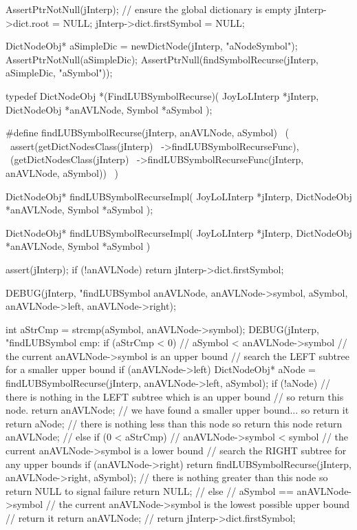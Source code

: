 \startCTest
  AssertPtrNotNull(jInterp);
  // ensure the global dictionary is empty
  jInterp->dict.root        = NULL;
  jInterp->dict.firstSymbol = NULL;

  DictNodeObj* aSimpleDic = newDictNode(jInterp, "aNodeSymbol");
  AssertPtrNotNull(aSimpleDic);
  AssertPtrNull(findSymbolRecurse(jInterp, aSimpleDic, "aSymbol"));
\stopCTest
\stopTestCase
\stopTestSuite

\startTestSuite[findLUBSymbolRecurse]

\startCHeader
typedef DictNodeObj *(FindLUBSymbolRecurse)(
  JoyLoLInterp *jInterp,
  DictNodeObj  *anAVLNode,
  Symbol       *aSymbol
);

#define findLUBSymbolRecurse(jInterp, anAVLNode, aSymbol)       \
  (                                                             \
    assert(getDictNodesClass(jInterp)                           \
      ->findLUBSymbolRecurseFunc),                              \
    (getDictNodesClass(jInterp)                                 \
      ->findLUBSymbolRecurseFunc(jInterp, anAVLNode, aSymbol))  \
  )
\stopCHeader

\setCHeaderStream{private}
\startCHeader
DictNodeObj* findLUBSymbolRecurseImpl(
  JoyLoLInterp *jInterp,
  DictNodeObj  *anAVLNode,
  Symbol       *aSymbol
);
\stopCHeader
\setCHeaderStream{public}

\startCCode
DictNodeObj* findLUBSymbolRecurseImpl(
  JoyLoLInterp *jInterp,
  DictNodeObj  *anAVLNode,
  Symbol       *aSymbol
) {
  assert(jInterp);
  if (!anAVLNode) return jInterp->dict.firstSymbol;

  DEBUG(jInterp, "findLUBSymbol %
        anAVLNode, anAVLNode->symbol, aSymbol,
        anAVLNode->left, anAVLNode->right);

  int aStrCmp = strcmp(aSymbol, anAVLNode->symbol);
  DEBUG(jInterp, "findLUBSymbol cmp: %
  if (aStrCmp < 0) {
    // aSymbol < anAVLNode->symbol
    // the current anAVLNode->symbol is an upper bound
    // search the LEFT subtree for a smaller upper bound
    if (anAVLNode->left) {
      DictNodeObj* aNode = findLUBSymbolRecurse(jInterp, anAVLNode->left, aSymbol);
      if (!aNode) {
        // there is nothing in the LEFT subtree which is an upper bound
        // so return this node.
        return anAVLNode;
      }
      // we have found a smaller upper bound... so return it
      return aNode;
    }
    // there is nothing less than this node so return this node
    return anAVLNode;
    //
  } else if (0 < aStrCmp) {
    // anAVLNode->symbol < symbol
    // the current anAVLNode->symbol is a lower bound
    // search the RIGHT subtree for any upper bounds
    if (anAVLNode->right) {
      return findLUBSymbolRecurse(jInterp, anAVLNode->right, aSymbol);
    }
    // there is nothing greater than this node so return NULL to signal failure
    return NULL;
    //
  } else {
    // aSymbol == anAVLNode->symbol
    // the current anAVLNode->symbol is the lowest possible upper bound
    // return it
    return anAVLNode;
    //
  }
  return jInterp->dict.firstSymbol;
}
\stopCCode
\stopTestSuite
